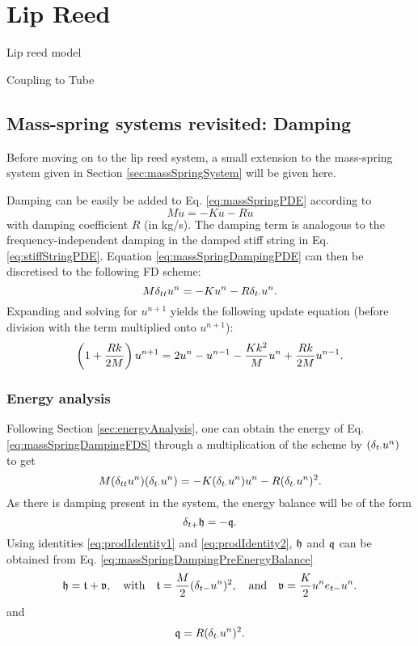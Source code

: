 \chapter{Lip Reed}\label{ch:lipreed}
Lip reed model



Coupling to Tube

\section{Mass-spring systems revisited: Damping}\label{sec:massSpringDamping}
Before moving on to the lip reed system, a small extension to the mass-spring system given in Section \ref{sec:massSpringSystem} will be given here. 

Damping can be easily be added to Eq. \eqref{eq:massSpringPDE} according to 
\begin{equation}\label{eq:massSpringDampingPDE}
    M\ddot u = -Ku - R\dot u
\end{equation}
with damping coefficient $R$ (in kg/s). The damping term is analogous to the frequency-independent damping in the damped stiff string in Eq. \eqref{eq:stiffStringPDE}. Equation \eqref{eq:massSpringDampingPDE} can then be discretised to the following FD scheme:
\begin{equation}\label{eq:massSpringDampingFDS}
    M\delta_{tt} u^n = -Ku^n - R\delta_{t\cdot} u^n.
\end{equation}
Expanding and solving for $u^{n+1}$ yields the following update equation (before division with the term multiplied onto $u^{n+1}$):
\begin{equation}\label{eq:massSpringDampingUpdate}
    \left(1+\frac{Rk}{2M}\right)u^{n+1} = 2 u^n - u^{n-1} - \frac{Kk^2}{M}u^n + \frac{Rk}{2M}u^{n-1}.
\end{equation}
\subsection{Energy analysis}
Following Section \ref{sec:energyAnalysis}, one can obtain the energy of Eq. \eqref{eq:massSpringDampingFDS} through a multiplication of the scheme by $(\delta_{t\cdot} u^n)$ to get
\begin{equation}\label{eq:massSpringDampingPreEnergyBalance}
    M(\delta_{tt} u^n)(\delta_{t\cdot} u^n) = -K(\delta_{t\cdot} u^n)u^n - R(\delta_{t\cdot} u^n)^2.
\end{equation}
As there is damping present in the system, the energy balance will be of the form 
\begin{equation*}
    \delta_{t+} \mathfrak{h} = -\mathfrak{q}.
\end{equation*}
Using identities \eqref{eq:prodIdentity1} and \eqref{eq:prodIdentity2}, $\mathfrak{h}$ and $\mathfrak{q}$ can be obtained from Eq. \eqref{eq:massSpringDampingPreEnergyBalance} 
\begin{equation}\label{eq:energyBalanceMassSpringDamper}
    \mathfrak{h} = \mathfrak{t} + \mathfrak{v}, \quad \text{with} \quad
    \mathfrak{t} = \frac{M}{2}(\delta_{t-}u^n)^2, \quad \text{and} \quad \mathfrak{v} = \frac{K}{2}u^n e_{t-}u^n.
\end{equation} 
and
\begin{equation}\label{eq:massDampingEnergy}
    \mathfrak{q} = R(\delta_{t\cdot} u^n)^2.
\end{equation}

